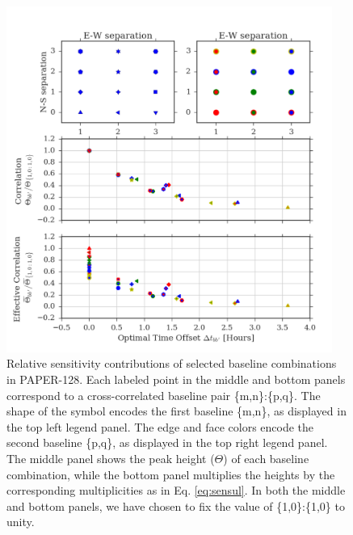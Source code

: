 \documentclass[twocolumn,apj,numberedappendix]{emulateapj}
\renewcommand\[{\begin{equation}}
\renewcommand\]{\end{equation}}
\begin{document}
\begin{figure}[h!]
\includegraphics[width=0.95\textwidth]{sensitivity_1}

\caption{Relative sensitivity contributions of selected baseline combinations in PAPER-128. Each labeled point in the middle and bottom panels correspond to a cross-correlated baseline pair \{m,n\}:\{p,q\}. The shape of the symbol encodes the first baseline \{m,n\}, as displayed in the top left legend panel. The edge and face colors encode the second baseline \{p,q\}, as displayed in the top right legend panel. The middle
panel shows the peak height ($\Theta$) of each baseline
combination, while the bottom panel multiplies the heights by the
corresponding multiplicities as in Eq. \eqref{eq:sensul}. 
In both the middle and bottom panels, we have chosen to fix the value  of \{1,0\}:\{1,0\} to unity.  }
\label{fig:sensplot}
\end{figure}
\end{document}
